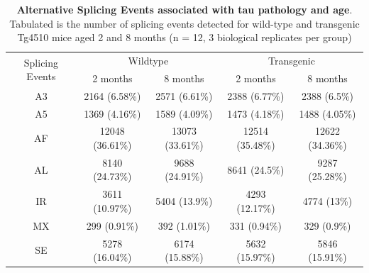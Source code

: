 \vspace{2cm}
\begin{table}[!htp]
	\centering
	\captionsetup{width=1\textwidth}
	\caption[Alternative Splicing Events associated with tau pathology and age]%
	{\textbf{Alternative Splicing Events associated with tau pathology and age}. Tabulated is the number of splicing events detected for wild-type and transgenic Tg4510 mice aged 2 and 8 months (n = 12, 3 biological replicates per group)}
	\begin{tabular}{@{}ccccc@{}}
		\toprule
		\multirow{2}{*}{Splicing  Events} & \multicolumn{2}{c}{Wildtype} & \multicolumn{2}{c}{Transgenic} \\ \cmidrule(l){2-5} 
		& 2 months        & 8 months        & 2 months        & 8 months        \\ \midrule
		A3 & 2164 (6.58\%)   & 2571 (6.61\%)   & 2388 (6.77\%)   & 2388 (6.5\%)    \\
		A5 & 1369 (4.16\%)   & 1589 (4.09\%)   & 1473 (4.18\%)   & 1488 (4.05\%)   \\
		AF & 12048 (36.61\%) & 13073 (33.61\%) & 12514 (35.48\%) & 12622 (34.36\%) \\
		AL & 8140 (24.73\%)  & 9688 (24.91\%)  & 8641 (24.5\%)   & 9287 (25.28\%)  \\
		IR & 3611 (10.97\%)  & 5404 (13.9\%)   & 4293 (12.17\%)  & 4774 (13\%)     \\
		MX & 299 (0.91\%)    & 392 (1.01\%)    & 331 (0.94\%)    & 329 (0.9\%)     \\
		SE & 5278 (16.04\%)  & 6174 (15.88\%)  & 5632 (15.97\%)  & 5846 (15.91\%)  \\ \bottomrule
	\end{tabular}
	\label{AS_WholeTranscriptome_diff}
\end{table}



